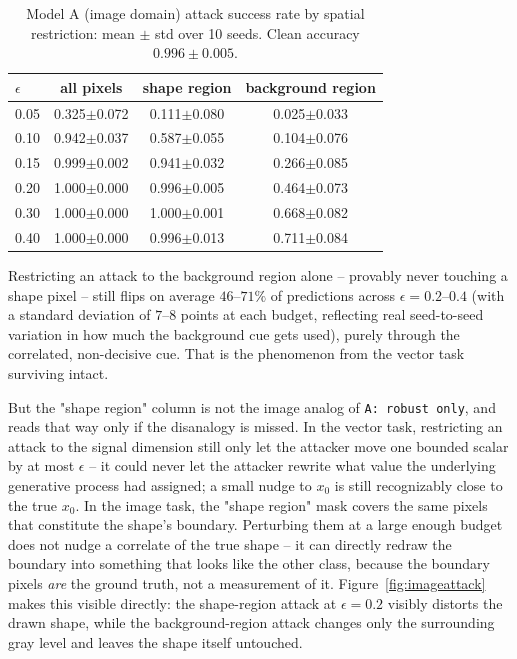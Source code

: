 \documentclass[11pt]{article}
\begin{document}
\begin{table}[h]
\centering
\caption{Model A (image domain) attack success rate by spatial restriction:
mean $\pm$ std over 10 seeds. Clean accuracy $0.996\pm0.005$.}
\label{tab:image}
\begin{tabular}{lccc}
\toprule
$\epsilon$ & all pixels & shape region & background region \\
\midrule
0.05 & 0.325$\pm$0.072 & 0.111$\pm$0.080 & 0.025$\pm$0.033 \\
0.10 & 0.942$\pm$0.037 & 0.587$\pm$0.055 & 0.104$\pm$0.076 \\
0.15 & 0.999$\pm$0.002 & 0.941$\pm$0.032 & 0.266$\pm$0.085 \\
0.20 & 1.000$\pm$0.000 & 0.996$\pm$0.005 & 0.464$\pm$0.073 \\
0.30 & 1.000$\pm$0.000 & 1.000$\pm$0.001 & 0.668$\pm$0.082 \\
0.40 & 1.000$\pm$0.000 & 0.996$\pm$0.013 & 0.711$\pm$0.084 \\
\bottomrule
\end{tabular}
\end{table}

Restricting an attack to the background region alone -- provably never
touching a shape pixel -- still flips on average $46$--$71\%$ of
predictions across $\epsilon=0.2$--$0.4$ (with a standard deviation of
$7$--$8$ points at each budget, reflecting real seed-to-seed variation in
how much the background cue gets used), purely through the correlated,
non-decisive cue. That is the phenomenon from the vector task surviving
intact.

But the "shape region" column is not the image analog of \texttt{A: robust
only}, and reads that way only if the disanalogy is missed. In the vector
task, restricting an attack to the signal dimension still only let the
attacker move one bounded scalar by at most $\epsilon$ -- it could never
let the attacker rewrite what value the underlying generative process had
assigned; a small nudge to $x_0$ is still recognizably close to the true
$x_0$. In the image task, the "shape region" mask covers the same pixels
that constitute the shape's boundary. Perturbing them at a large enough
budget does not nudge a correlate of the true shape -- it can directly
redraw the boundary into something that looks like the other class,
because the boundary pixels \emph{are} the ground truth, not a measurement
of it. Figure~\ref{fig:imageattack} makes this visible directly: the
shape-region attack at $\epsilon=0.2$ visibly distorts the drawn shape,
while the background-region attack changes only the surrounding gray level
and leaves the shape itself untouched.
\end{document}
